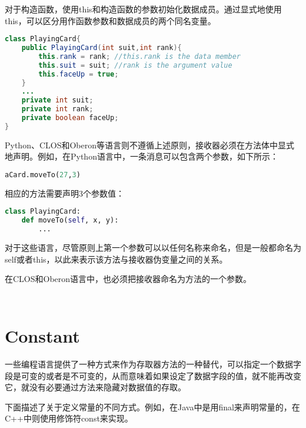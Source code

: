 对于构造函数，使用this和构造函数的参数初始化数据成员。通过显式地使用this，可以区分用作函数参数和数据成员的两个同名变量。


\begin{lstlisting}[language=Java]
class PlayingCard{
	public PlayingCard(int suit,int rank){
		this.rank = rank; //this.rank is the data member
		this.suit = suit; //rank is the argument value
		this.faceUp = true;
	}
	...
	private int suit;
	private int rank;
	private boolean faceUp;
}
\end{lstlisting}

Python、CLOS和Oberon等语言则不遵循上述原则，接收器必须在方法体中显式地声明。例如，在Python语言中，一条消息可以包含两个参数，如下所示：




\begin{lstlisting}[language=Python]
aCard.moveTo(27,3)
\end{lstlisting}

相应的方法需要声明3个参数值：


\begin{lstlisting}[language=Python]
class PlayingCard:
	def moveTo(self, x, y):
		...
\end{lstlisting}


对于这些语言，尽管原则上第一个参数可以以任何名称来命名，但是一般都命名为self或者this，以此来表示该方法与接收器伪变量之间的关系。

在CLOS和Oberon语言中，也必须把接收器命名为方法的一个参数。


\begin{lstlisting}[language=Java]

\end{lstlisting}




\begin{lstlisting}[language=Java]

\end{lstlisting}

\section{Constant}

一些编程语言提供了一种方式来作为存取器方法的一种替代，可以指定一个数据字段是可变的或者是不可变的，从而意味着如果设定了数据字段的值，就不能再改变它，就没有必要通过方法来隐藏对数据值的存取。


下面描述了关于定义常量的不同方式。例如，在Java中是用final来声明常量的，在C++中则使用修饰符const来实现。


